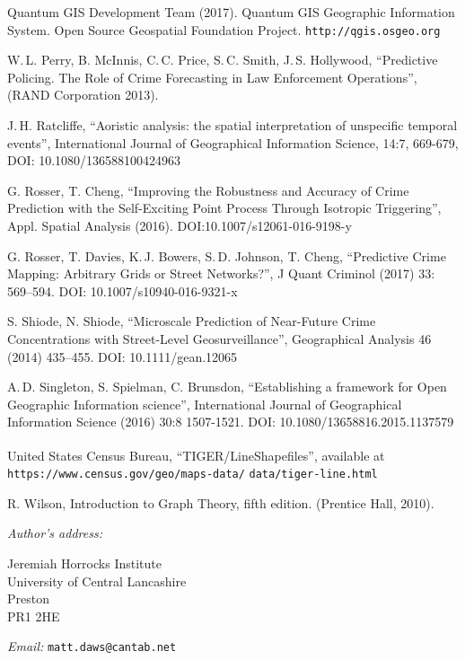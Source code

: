 \documentclass[twoside,a4paper,twocolumn,10pt]{article}
\theoremstyle{plain}
\theoremstyle{definition}
\newcommand{\regsym}{\textsuperscript{\textregistered}}
\begin{document}
\begin{thebibliography}{99}
 Quantum GIS Development Team (2017).
  Quantum GIS Geographic Information System. Open Source Geospatial Foundation Project.
  {\small\texttt{http://qgis.osgeo.org}}

 W.\,L. Perry, B. McInnis, C.\,C. Price, S.\,C. Smith, J.\,S. Hollywood,
        ``Predictive Policing. The Role of Crime Forecasting in Law Enforcement Operations'',
        (RAND Corporation 2013).

 J.\,H. Ratcliffe, ``Aoristic analysis: the spatial interpretation of unspecific
temporal events'', International Journal of Geographical Information Science, 14:7, 669-679, DOI:
10.1080/136588100424963

 G. Rosser, T. Cheng, ``Improving the Robustness and Accuracy of Crime
   Prediction with the Self-Exciting Point Process Through Isotropic Triggering'',
   Appl. Spatial Analysis (2016). DOI:10.1007/s12061-016-9198-y

 G. Rosser, T. Davies, K.\,J. Bowers, S.\,D. Johnson, T. Cheng,
   ``Predictive Crime Mapping: Arbitrary Grids or Street Networks?'',
   J Quant Criminol (2017) 33: 569--594. DOI: 10.1007/s10940-016-9321-x

 S. Shiode, N. Shiode,
   ``Microscale Prediction of Near-Future Crime Concentrations with Street-Level Geosurveillance'',
   Geographical Analysis 46 (2014) 435--455.  DOI: 10.1111/gean.12065

 A.\,D. Singleton, S. Spielman, C. Brunsdon,
   ``Establishing a framework for Open Geographic Information science'',
   International Journal of Geographical Information Science (2016) 30:8 1507-1521.
   DOI: 10.1080/13658816.2015.1137579

 United States Census Bureau, ``TIGER/Line\regsym Shapefiles'',
   available at
   {\small\texttt{https://www.census.gov/geo/maps-data/}
   \texttt{data/tiger-line.html}}

 R. Wilson, Introduction to Graph Theory, fifth edition.
   (Prentice Hall, 2010).
   
\end{thebibliography}


\vspace{5ex}

\noindent\emph{Author's address:}
\parbox[t]{3in}{Jeremiah Horrocks Institute\\
University of Central Lancashire\\
Preston\\
PR1 2HE}

\bigskip\noindent\emph{Email:} \texttt{matt.daws@cantab.net}
\end{document}
